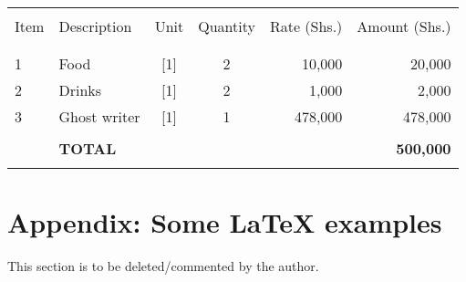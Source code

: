 \begin{center}%
\begin{minipage}{\columnwidth}%
	\centering%
	\label{tbl:Budget}
	\begin{tabular}{llccrr}
		\hline \\
			Item & Description    & Unit      & Quantity  & Rate (Shs.) & Amount (Shs.)    \\
		\\
		\hline \\				
			1    & Food           & [1]       & 2         & 10,000      & 20,000           \\
			2    & Drinks         & [1]       & 2         & 1,000       & 2,000            \\
			3    & Ghost writer   & [1]       & 1         & 478,000     & 478,000          \\
		\\
			 & \textbf{TOTAL} &           &           &             & \textbf{500,000}\\
		\hline \\ 
	\end{tabular}
\end{minipage}
\end{center}

\clearpage  %
\chapter*{Appendix: Some \LaTeX{} examples}
\label{cha:Appendix}
This section is to be deleted/commented by the author.
